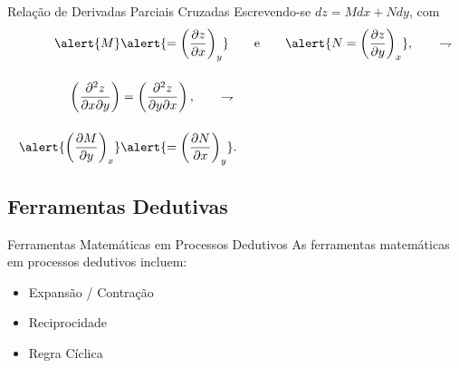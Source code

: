     \begin{frame}{Relação de Derivadas Parciais Cruzadas}\vspace*{-1em}
        Escrevendo-se \alert{$dz = Mdx + Ndy$}, com
        \begin{align*}
            \alert{M} &\alert{=
                \left(
                    \frac{\partial z}{\partial x}
                \right)_y}
            \qquad\mbox{e}\qquad
            \alert{N =
                \left(
                    \frac{\partial z}{\partial y}
                \right)_x},
            \qquad\rightharpoondown
            \\[\bigskipamount]
            \left(
                \frac{\partial^2 z}{\partial x\partial y}
            \right) &=
            \left(
                \frac{\partial^2 z}{\partial y\partial x}
            \right),
            \qquad\rightharpoondown
            \\[\bigskipamount]
            \alert{\left(
                \frac{\partial M}{\partial y}
            \right)_x} &\alert{=
            \left(
                \frac{\partial N}{\partial x}
            \right)_y}.
        \end{align*}
    \end{frame}

\subsection{Ferramentas Dedutivas}

    \begin{frame}{Ferramentas Matemáticas em Processos Dedutivos}\vspace*{-1em}
        As ferramentas matemáticas em processos dedutivos incluem: \vspace*\bigskipamount

        \begin{itemize}
            \item \alert{Expansão / Contração} \vspace*\medskipamount
            \item \alert{Reciprocidade} \vspace*\medskipamount
            \item \alert{Regra Cíclica}
        \end{itemize}
    \end{frame}

